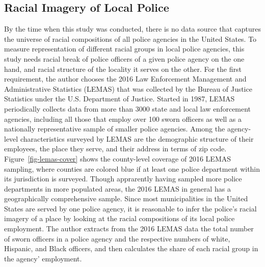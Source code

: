 \documentclass[
  12pt,
]{article}
\begin{document}
\hypertarget{racial-imagery-of-local-police}{%
\subsection{Racial Imagery of Local
Police}\label{racial-imagery-of-local-police}}

By the time when this study was conducted, there is no data source that
captures the universe of racial compositions of all police agencies in
the United States. To measure representation of different racial groups
in local police agencies, this study needs racial break of police
officers of a given police agency on the one hand, and racial structure
of the locality it serves on the other. For the first requirement, the
author chooses the 2016 Law Enforcement Management and Administrative
Statistics (LEMAS) that was collected by the Bureau of Justice
Statistics under the U.S. Department of Justice. Started in 1987, LEMAS
periodically collects data from more than 3000 state and local law
enforcement agencies, including all those that employ over 100 sworn
officers as well as a nationally representative sample of smaller police
agencies. Among the agency-level characteristics surveyed by LEMAS are
the demographic structure of their employees, the place they serve, and
their address in terms of zip code. Figure~\ref{fig-lemas-cover} shows
the county-level coverage of 2016 LEMAS sampling, where counties are
colored blue if at least one police department within its jurisdiction
is surveyed. Though apprarently having sampled more police departments
in more populated areas, the 2016 LEMAS in general has a geographically
comprehensive sample. Since most municipalities in the United States are
served by one police agency, it is reasonable to infer the police's
racial imagery of a place by looking at the racial compositions of its
local police employment. The author extracts from the 2016 LEMAS data
the total number of sworn officers in a police agency and the respective
numbers of white, Hispanic, and Black officers, and then calculates the
share of each racial group in the agency' employment.
\end{document}
